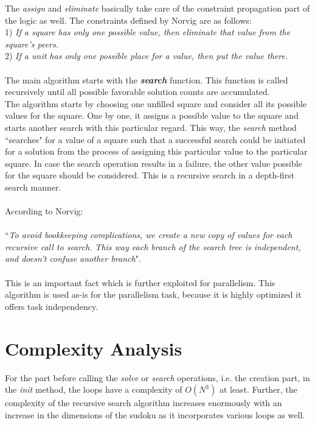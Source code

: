 \documentclass[a4paper,10pt,twoside]{article}
\begin{document}
The \textit{assign} and \textit{eliminate} basically take care of the constraint propagation part of the logic as well. The constraints defined by Norvig are as follows: \\
1) \textit{If a square has only one possible value, then eliminate that value from the square's peers.}\\
2) \textit{If a unit has only one possible place for a value, then put the value there.}\\ \\
The main algorithm starts with the \textbf{\textit{search}} function.
This function is called recursively until all possible favorable solution counts are accumulated.\\
The algorithm starts by choosing one unfilled square and consider all its possible values for the square. One by one, it assigns a possible value to the square and starts another search with this particular regard. This way, the \textit{search} method ``searches" for a value of a square such that a successful search could be initiated for a solution from the process of assigning this particular value to the particular square. In case the search operation results in a failure, the other value possible for the square should be considered. This is a recursive search in a depth-first search manner.\\ \\
According to Norvig:\\ \\
``\textit{To avoid bookkeeping complications, we create a new copy of values for each recursive call to search. This way each branch of the search tree is independent, and doesn't confuse another branch}".\\ \\
This is an important fact which is further exploited for parallelism. This algorithm is used as-is for the parallelism task, because it is highly optimized it offers task independency.

\section{Complexity Analysis}
For the part before calling the \textit{solve} or \textit{search} operations, i.e. the creation part, in the \textit{init} method, the loops have a complexity of $O(N^{3})$ at least. Further, the complexity of the recursive search algorithm increases enormously with an increase in the dimensions of the sudoku as it incorporates various loops as well.
\end{document}

